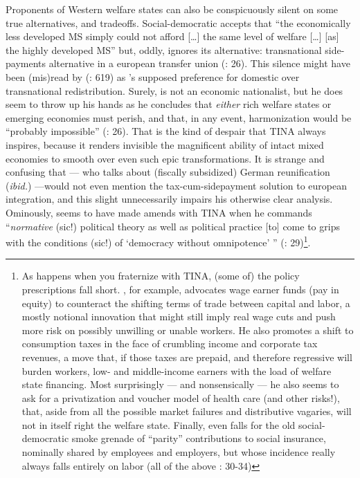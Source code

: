\documentclass[11pt,a4paper,oneside,openright]{article}
\begin{document}
Proponents of Western welfare states can also be conspicuously silent on some true alternatives, and tradeoffs. Social-democratic \cite{Scharpf1997} accepts that ``the economically less developed \gls{MS} simply could not afford [\ldots] the same level of welfare [\ldots] [as] the highly developed \gls{MS}'' but, oddly, ignores its alternative: transnational side-payments alternative in a european transfer union (\citeyear{Scharpf1997}: 26). This silence might have been (mis)read by \citeauthor{Moravcsik-2002-aa} (\citeyear{Moravcsik-2002-aa}: 619) as \citeauthor{Scharpf1997}'s supposed preference for domestic over transnational redistribution. Surely, \citeauthor{Scharpf1997} is not an economic nationalist, but he does seem to throw up his hands as he concludes that \emph{either} rich welfare states or emerging economies must perish, and that, in any event, harmonization would be ``probably impossible'' (\citeyear{Scharpf1997}: 26). That is the kind of despair that TINA always inspires, because it renders invisible the magnificent ability of intact mixed economies to smooth over even such epic transformations. It is strange and confusing that \citeauthor{Scharpf1997} --- who talks about (fiscally subsidized) German reunification (\emph{ibid.}) ---would not even mention the tax-cum-sidepayment solution to european integration, and this slight unnecessarily impairs his otherwise clear analysis. Ominously, \citeauthor{Scharpf1997} seems to have made amends with TINA when he commands ``\emph{normative} (sic!) political theory as well as political practice [to] come to grips with the conditions (sic!) of `democracy without omnipotence' '' (\citeyear{Scharpf1997}: 29)\footnote{
	As happens when you fraternize with TINA, (some of) the policy prescriptions fall short. \citeauthor{Scharpf1997}, for example, advocates wage earner funds (pay in equity) to counteract the shifting terms of trade between capital and labor, a mostly notional innovation that might still imply real wage cuts and push more risk on possibly unwilling or unable workers. He also promotes a shift to consumption taxes in the face of crumbling income and corporate tax revenues, a move that, if those taxes are prepaid, and therefore regressive will burden workers, low- and middle-income earners with the load of welfare state financing. Most surprisingly --- and nonsensically --- he also seems to ask for a privatization and voucher model of health care (and other risks!), that, aside from all the possible market failures and distributive vagaries, will not in itself right the welfare state. Finally, \citeauthor{Scharpf1997} even falls for the old social-democratic smoke grenade of ``parity'' contributions to social insurance, nominally shared by employees and employers, but whose incidence really always falls entirely on labor (all of the above \citeyear{Scharpf1997}: 30-34)}.
\end{document}
